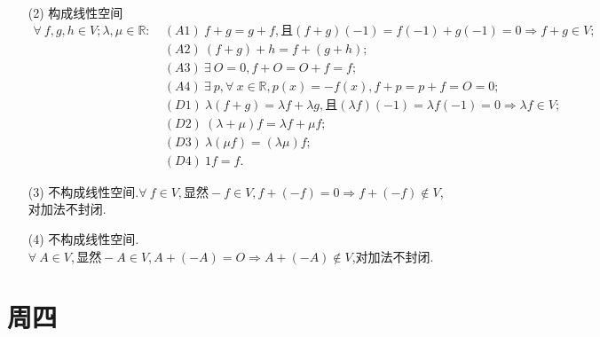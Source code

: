 \documentclass{article}
\begin{document}
\begin{enumerate}
\begin{enumerate}
        \item [(2)]构成线性空间
        \begin{align*}
            \forall\ f,g,h\in V;\lambda,\mu \in \mathbb{R}:
            &\ (A1)\ f+g=g+f,\mbox{且}(f+g)(-1)=f(-1)+g(-1)=0\Rightarrow f+g\in V;\\
            &\ (A2)\ (f+g)+h=f+(g+h);\\
            &\ (A3)\ \exists\ O=0,f+O=O+f=f;\\
            &\ (A4)\ \exists\ p,\forall\ x\in\mathbb{R},p(x)=-f(x),f+p=p+f=O=0;\\
            &\ (D1)\ \lambda(f+g)=\lambda f+\lambda g,\mbox{且} (\lambda f)(-1)=\lambda f(-1)=0\Rightarrow \lambda f\in V;\\
            &\ (D2)\ (\lambda+\mu)f=\lambda f+\mu f;\\
            &\ (D3)\ \lambda(\mu f)=(\lambda \mu)f;\\
            &\ (D4)\ 1f=f.
        \end{align*}
        \item [(3)]不构成线性空间.$\forall\ f\in V,\mbox{显然}-f\in V,f+(-f)=0\Rightarrow f+(-f)\notin V$,对加法不封闭.
        \item [(4)]不构成线性空间.$\forall\ A\in V,\mbox{显然}-A\in V,A+(-A)=O\Rightarrow A+(-A)\notin V$,对加法不封闭.
    \end{enumerate}
\end{enumerate}
\section{周四}
\end{document}
